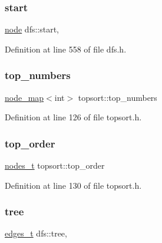 \subsubsection{\texorpdfstring{start}{start}}
{\footnotesize\ttfamily \mbox{\hyperlink{classnode}{node}} dfs\+::start\hspace{0.3cm}{\ttfamily [protected]}, {\ttfamily [inherited]}}



Definition at line 558 of file dfs.\+h.

\mbox{\label{classtopsort_ae57da1aae22ed92acd0d84c737a1da2b}} 
\subsubsection{\texorpdfstring{top\+\_\+numbers}{top\_numbers}}
{\footnotesize\ttfamily \mbox{\hyperlink{classnode__map}{node\+\_\+map}}$<$int$>$ topsort\+::top\+\_\+numbers\hspace{0.3cm}{\ttfamily [protected]}}



Definition at line 126 of file topsort.\+h.

\mbox{\label{classtopsort_a8b18b1b7ce816683694d6ac567e55cb8}} 
\subsubsection{\texorpdfstring{top\+\_\+order}{top\_order}}
{\footnotesize\ttfamily \mbox{\hyperlink{edge_8h_a22ac17689106ba21a84e7bc54d1199d6}{nodes\+\_\+t}} topsort\+::top\+\_\+order\hspace{0.3cm}{\ttfamily [protected]}}



Definition at line 130 of file topsort.\+h.

\mbox{\label{classdfs_aed496b618a937723bfec0b463e17e8d5}} 
\subsubsection{\texorpdfstring{tree}{tree}}
{\footnotesize\ttfamily \mbox{\hyperlink{edge_8h_a8f9587479bda6cf612c103494b3858e3}{edges\+\_\+t}} dfs\+::tree\hspace{0.3cm}{\ttfamily [protected]}, {\ttfamily [inherited]}}



